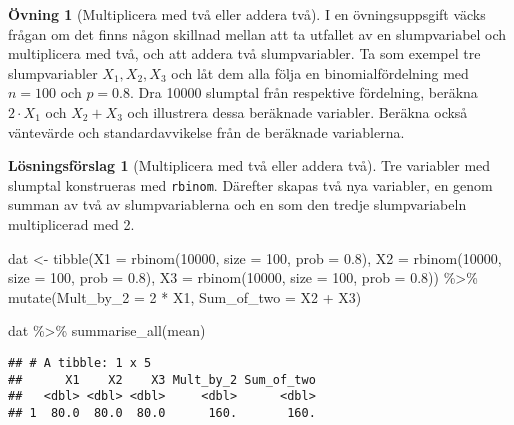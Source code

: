\documentclass[
]{book}
\newenvironment{Shaded}{\begin{snugshade}}{\end{snugshade}}
\newcommand{\AttributeTok}[1]{\textcolor[rgb]{0.77,0.63,0.00}{#1}}
\newcommand{\DecValTok}[1]{\textcolor[rgb]{0.00,0.00,0.81}{#1}}
\newcommand{\FloatTok}[1]{\textcolor[rgb]{0.00,0.00,0.81}{#1}}
\newcommand{\FunctionTok}[1]{\textcolor[rgb]{0.00,0.00,0.00}{#1}}
\newcommand{\NormalTok}[1]{#1}
\newcommand{\OtherTok}[1]{\textcolor[rgb]{0.56,0.35,0.01}{#1}}
\newcommand{\SpecialCharTok}[1]{\textcolor[rgb]{0.00,0.00,0.00}{#1}}
\theoremstyle{definition}
\theoremstyle{definition}
\theoremstyle{definition}
\newtheorem{exercise}{Övning}[chapter]
\theoremstyle{definition}
\newtheorem{hypothesis}{Lösningsförslag}[chapter]
\theoremstyle{remark}
\begin{document}
\begin{exercise}[Multiplicera med två eller addera två]
I en övningsuppsgift väcks frågan om det finns någon skillnad mellan att ta utfallet av en slumpvariabel och multiplicera med två, och att addera två slumpvariabler. Ta som exempel tre slumpvariabler \(X_1, X_2, X_3\) och låt dem alla följa en binomialfördelning med \(n = 100\) och \(p = 0.8\). Dra 10000 slumptal från respektive fördelning, beräkna \(2 \cdot X_1\) och \(X_2 + X_3\) och illustrera dessa beräknade variabler. Beräkna också väntevärde och standardavvikelse från de beräknade variablerna.
\end{exercise}

\begin{hypothesis}[Multiplicera med två eller addera två]
Tre variabler med slumptal konstrueras med \texttt{rbinom}. Därefter skapas två nya variabler, en genom summan av två av slumpvariablerna och en som den tredje slumpvariabeln multiplicerad med 2.

\begin{Shaded}
\begin{Highlighting}[]
\NormalTok{dat }\OtherTok{\textless{}{-}} \FunctionTok{tibble}\NormalTok{(}\AttributeTok{X1 =} \FunctionTok{rbinom}\NormalTok{(}\DecValTok{10000}\NormalTok{, }\AttributeTok{size =} \DecValTok{100}\NormalTok{, }\AttributeTok{prob =} \FloatTok{0.8}\NormalTok{),}
              \AttributeTok{X2 =} \FunctionTok{rbinom}\NormalTok{(}\DecValTok{10000}\NormalTok{, }\AttributeTok{size =} \DecValTok{100}\NormalTok{, }\AttributeTok{prob =} \FloatTok{0.8}\NormalTok{),}
              \AttributeTok{X3 =} \FunctionTok{rbinom}\NormalTok{(}\DecValTok{10000}\NormalTok{, }\AttributeTok{size =} \DecValTok{100}\NormalTok{, }\AttributeTok{prob =} \FloatTok{0.8}\NormalTok{)) }\SpecialCharTok{\%\textgreater{}\%} 
  \FunctionTok{mutate}\NormalTok{(}\AttributeTok{Mult\_by\_2 =} \DecValTok{2} \SpecialCharTok{*}\NormalTok{ X1,}
         \AttributeTok{Sum\_of\_two =}\NormalTok{ X2 }\SpecialCharTok{+}\NormalTok{ X3)}

\NormalTok{dat }\SpecialCharTok{\%\textgreater{}\%} 
  \FunctionTok{summarise\_all}\NormalTok{(mean)}
\end{Highlighting}
\end{Shaded}

\begin{verbatim}
## # A tibble: 1 x 5
##      X1    X2    X3 Mult_by_2 Sum_of_two
##   <dbl> <dbl> <dbl>     <dbl>      <dbl>
## 1  80.0  80.0  80.0      160.       160.
\end{verbatim}


\end{hypothesis}
\end{document}
